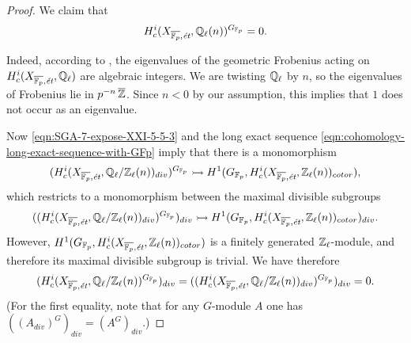 \documentclass{article}
\numberwithin{equation}{section}
\begin{document}
\begin{proposition}
\begin{proof}
    We claim that
    \begin{equation}
      \label{eqn:SGA-7-expose-XXI-5-5-3}
      H^i_c (X_{\overline{\mathbb{F}_p},\text{\it ét}}, \mathbb{Q}_\ell (n))^{G_{\mathbb{F}_p}} = 0.
    \end{equation}

    Indeed, according to \cite[Exposé~XXI, 5.5.3]{SGA7}, the eigenvalues of the
    geometric Frobenius acting on
    $H^i_c (X_{\overline{\mathbb{F}_p},\text{\it ét}}, \mathbb{Q}_\ell)$ are algebraic
    integers. We are twisting $\mathbb{Q}_\ell$ by $n$, so the eigenvalues of Frobenius
    lie in $p^{-n}\,\overline{\mathbb{Z}}$. Since $n < 0$ by our assumption, this
    implies that $1$ does not occur as an eigenvalue.

    Now \eqref{eqn:SGA-7-expose-XXI-5-5-3} and the long exact sequence
    \eqref{eqn:cohomology-long-exact-sequence-with-GFp} imply that there is a
    monomorphism
    \[ (H^i_c (X_{\overline{\mathbb{F}_p},\text{\it ét}}, \mathbb{Q}_\ell/\mathbb{Z}_\ell (n))_{div})^{G_{\mathbb{F}_p}} \rightarrowtail
    H^1 (G_{\mathbb{F}_p}, H^i_c (X_{\overline{\mathbb{F}_p},\text{\it ét}}, \mathbb{Z}_\ell (n))_{cotor}), \]
    which restricts to a monomorphism between the maximal divisible subgroups
    \[ ((H^i_c (X_{\overline{\mathbb{F}_p},\text{\it ét}}, \mathbb{Q}_\ell/\mathbb{Z}_\ell (n))_{div})^{G_{\mathbb{F}_p}})_{div} \rightarrowtail
    H^1 (G_{\mathbb{F}_p}, H^i_c (X_{\overline{\mathbb{F}_p},\text{\it ét}}, \mathbb{Z}_\ell (n))_{cotor})_{div}. \]
    However,
    $H^1 (G_{\mathbb{F}_p}, H^i_c (X_{\overline{\mathbb{F}_p},\text{\it ét}}, \mathbb{Z}_\ell (n))_{cotor})$
    is a finitely generated $\mathbb{Z}_\ell$-module, and therefore its
    maximal divisible subgroup is trivial. We have therefore
    \[ (H^i_c (X_{\overline{\mathbb{F}_p},\text{\it ét}}, \mathbb{Q}_\ell/\mathbb{Z}_\ell (n))^{G_{\mathbb{F}_p}})_{div} =
    ((H^i_c (X_{\overline{\mathbb{F}_p},\text{\it ét}}, \mathbb{Q}_\ell/\mathbb{Z}_\ell (n))_{div})^{G_{\mathbb{F}_p}})_{div} = 0. \]
    (For the first equality, note that for any $G$-module $A$ one has
    $((A_{div})^G)_{div} = (A^G)_{div}$.)
  \end{proof}
\end{proposition}
\end{document}
